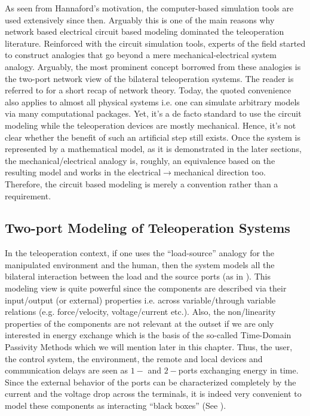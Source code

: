 As seen from Hannaford's motivation, the computer-based simulation tools are used extensively since then. Arguably
this is one of the main reasons why network based electrical circuit based modeling dominated the teleoperation literature. 
Reinforced with the circuit simulation tools, experts of the field started to construct analogies that go beyond
a mere mechanical-electrical system analogy. Arguably, the most prominent concept borrowed from these analogies is the two-port network 
view of the bilateral teleoperation systems. The reader is referred to  for a short recap of network theory.
Today, the quoted convenience also applies to almost all physical systems i.e. one can simulate arbitrary models via many 
computational packages. Yet, it's a de facto standard to use the circuit modeling while the teleoperation devices are mostly 
mechanical. Hence, it's not clear whether the benefit of such an artificial step still exists. Once the system is represented 
by a mathematical model, as it is demonstrated in the later sections, the mechanical/electrical analogy is, roughly, an equivalence
based on the resulting model and works in the electrical$\to$mechanical direction too. Therefore, the 
circuit based modeling is merely a convention rather than a requirement.

\subsection{Two-port Modeling of Teleoperation Systems}

In the teleoperation context, if one uses the \enquote{load-source} analogy for the manipulated environment 
and the human, then the system models all the bilateral interaction between the load and the source 
ports (as in ). This modeling view is quite powerful since the components are described via their input/output 
(or external) properties i.e. across variable/through variable relations (e.g. force/velocity, voltage/current etc.). Also, the non/linearity
properties of the components are not relevant at the outset if we are only interested in energy exchange which is the basis
of the so-called Time-Domain Passivity Methods \cite{hannafordryu} which we will mention later in this chapter. Thus, 
the user, the control system, the environment, the remote and local devices and communication delays are seen as 
$1-$ and $2-$ports exchanging energy in time. Since the external behavior of the ports can be characterized completely by the 
current and the voltage drop across the terminals, it is indeed very convenient to model these components as 
interacting \enquote{black boxes} (See ).

